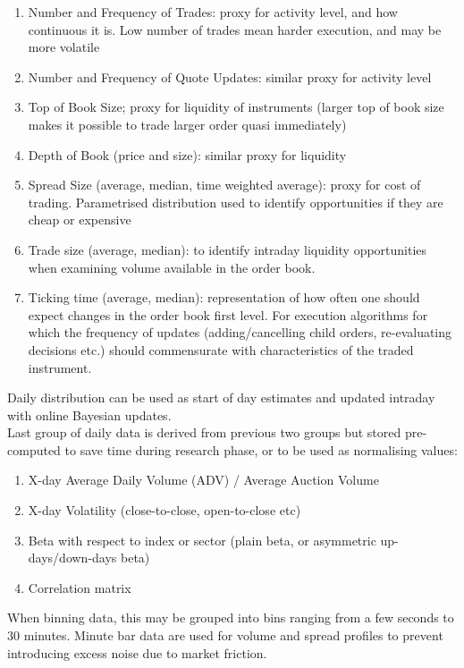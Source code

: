 \begin{definition} 
\begin{enumerate}[label=\roman*.]
\setlength{\itemsep}{0pt}
\item Number and Frequency of Trades: proxy for activity level, and how continuous it is. Low number of trades mean harder execution, and may be more volatile
\item Number and Frequency of Quote Updates: similar proxy for activity level
\item Top of Book Size; proxy for liquidity of instruments (larger top of book size makes it possible to trade larger order quasi immediately)
\item Depth of Book (price and size): similar proxy for liquidity
\item Spread Size (average, median, time weighted average): proxy for cost of trading. Parametrised distribution used to identify opportunities if they are cheap or expensive
\item Trade size (average, median): to identify intraday liquidity opportunities when examining volume available in the order book.
\item Ticking time (average, median): representation of how often one should expect changes in the order book first level. For execution algorithms for which the frequency of updates (adding/cancelling child orders, re-evaluating decisions etc.) should commensurate with characteristics of the traded instrument.
\end{enumerate}
Daily distribution can be used as start of day estimates and updated intraday with online Bayesian updates.\\
Last group of daily data is derived from previous two groups but stored pre-computed to save time during research phase, or to be used as normalising values:
\begin{enumerate}[label=\roman*.]
\setlength{\itemsep}{0pt}
\item X-day Average Daily Volume (ADV) / Average Auction Volume
\item X-day Volatility (close-to-close, open-to-close etc)
\item Beta with respect to index or sector (plain beta, or asymmetric up-days/down-days beta)
\item Correlation matrix
\end{enumerate}
When binning data, this may be grouped into bins ranging from a few seconds to 30 minutes. Minute bar data are used for volume and spread profiles to prevent introducing excess noise due to market friction.
\end{definition}

